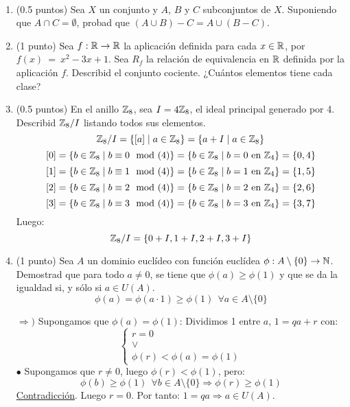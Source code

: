 \documentclass[12pt]{article}
\begin{document}
    \begin{ejercicio}[4 puntos]
        \ 
        \begin{enumerate} 
            \item (0.5 puntos) Sea $X$ un conjunto y $A$, $B$ y $C$ subconjuntos de $X$. Suponiendo que $A \cap C = \emptyset$, probad que $(A \cup B)-C=A\cup (B-C)$.
            \item (1 punto) Sea $f:\mathbb{R}\rightarrow \mathbb{R}$ la aplicación definida para cada $x \in \mathbb{R}$, por $f(x)~=~x^2-3x+1$. Sea $R_f$ la relación de equivalencia en $\mathbb{R}$ definida por la aplicación $f$. Describid el conjunto cociente. ¿Cuántos elementos tiene cada clase?
            \item (0.5 puntos) En el anillo $\mathbb{Z}_8$, sea $I = 4\mathbb{Z}_8$, el ideal principal generado por 4. Describid $\mathbb{Z}_8/I$ listando todos sus elementos.\\

                \noindent
                $$\mathbb{Z}_8/I = \{[a] \mid a \in \mathbb{Z}_8\} = \{a+I \mid a \in \mathbb{Z}_8\}$$
                $$[0] = \{ b \in \mathbb{Z}_8 \mid b \equiv 0 \mod (4) \} = \{ b \in \mathbb{Z}_8 \mid b = 0 \mbox{ en } \mathbb{Z}_4 \} = \{ 0,4 \}$$
                $$[1] = \{ b \in \mathbb{Z}_8 \mid b \equiv 1 \mod (4) \} = \{ b \in \mathbb{Z}_8 \mid b = 1 \mbox{ en } \mathbb{Z}_4 \} = \{ 1,5 \}$$
                $$[2] = \{ b \in \mathbb{Z}_8 \mid b \equiv 2 \mod (4) \} = \{ b \in \mathbb{Z}_8 \mid b = 2 \mbox{ en } \mathbb{Z}_4 \} = \{ 2,6 \}$$
                $$[3] = \{ b \in \mathbb{Z}_8 \mid b \equiv 3 \mod (4) \} = \{ b \in \mathbb{Z}_8 \mid b = 3 \mbox{ en } \mathbb{Z}_4 \} = \{ 3,7 \}$$
                Luego:
                $$\mathbb{Z}_8/I = \{ 0+I, 1+I, 2+I, 3+I \}$$

            \item (1 punto) Sea $A$ un dominio euclídeo con función euclídea $\phi:A \setminus \{0\}\rightarrow \mathbb{N}$. Demostrad que para todo $a \neq 0$, se tiene que $\phi(a) \geq \phi(1)$ y que se da la igualdad si, y sólo si $a \in U(A)$.\\

                $$\phi(a) = \phi(a \cdot 1) \geq \phi(1)~~\forall a \in A \setminus \{0\}$$

                \noindent
                $\Rightarrow)$ Supongamos que $\phi(a) = \phi(1)$:\newline
                Dividimos 1 entre $a$, $1 = qa + r$ con:
                $$\left\{ \begin{array}{l}
                    r = 0 \\
                    \lor \\
                    \phi(r) < \phi(a) = \phi(1)
                \end{array}\right.$$
                $\bullet$ Supongamos que $r \neq 0$, luego $\phi(r) < \phi(1)$, pero:
                $$\phi(b) \geq \phi(1)~~\forall b \in A \setminus\{0\} \Rightarrow \phi(r) \geq \phi(1)$$
                \underline{Contradicción}. Luego $r = 0$.\newline
                Por tanto: $1 = qa \Rightarrow a \in U(A)$.\\


\end{enumerate}
\end{ejercicio}
\end{document}
